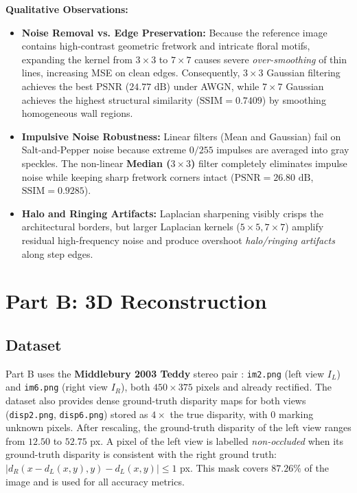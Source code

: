 \documentclass[a4paper,12pt]{article}
\begin{document}
\textbf{Qualitative Observations:}
\begin{itemize}
    \item \textbf{Noise Removal vs. Edge Preservation:} Because the reference image contains high-contrast geometric fretwork and intricate floral motifs, expanding the kernel from $3\times 3$ to $7\times 7$ causes severe \textit{over-smoothing} of thin lines, increasing MSE on clean edges. Consequently, $3\times 3$ Gaussian filtering achieves the best PSNR ($24.77\text{ dB}$) under AWGN, while $7\times 7$ Gaussian achieves the highest structural similarity ($\text{SSIM}=0.7409$) by smoothing homogeneous wall regions.
    \item \textbf{Impulsive Noise Robustness:} Linear filters (Mean and Gaussian) fail on Salt-and-Pepper noise because extreme $0/255$ impulses are averaged into gray speckles. The non-linear \textbf{Median ($3\times 3$)} filter completely eliminates impulse noise while keeping sharp fretwork corners intact ($\text{PSNR}=26.80\text{ dB}$, $\text{SSIM}=0.9285$).
    \item \textbf{Halo and Ringing Artifacts:} Laplacian sharpening visibly crisps the architectural borders, but larger Laplacian kernels ($5\times 5, 7\times 7$) amplify residual high-frequency noise and produce overshoot \textit{halo/ringing artifacts} along step edges.
\end{itemize}

\section{Part B: 3D Reconstruction}
\subsection{Dataset}
Part B uses the \textbf{Middlebury 2003 Teddy} stereo pair \cite{middlebury}: \texttt{im2.png} (left view $I_L$) and \texttt{im6.png} (right view $I_R$), both $450\times 375$ pixels and already rectified. The dataset also provides dense ground-truth disparity maps for both views (\texttt{disp2.png}, \texttt{disp6.png}) stored as $4\times$ the true disparity, with $0$ marking unknown pixels. After rescaling, the ground-truth disparity of the left view ranges from $12.50$ to $52.75$ px. A pixel of the left view is labelled \emph{non-occluded} when its ground-truth disparity is consistent with the right ground truth: $|d_R(x - d_L(x,y), y) - d_L(x,y)| \le 1$ px. This mask covers $87.26\%$ of the image and is used for all accuracy metrics.
\end{document}
